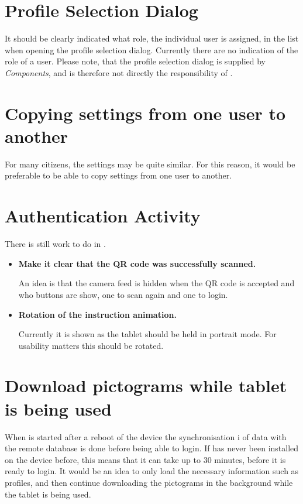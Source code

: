 \section{Profile Selection Dialog}
It should be clearly indicated what role, the individual user is assigned, in the list when opening the profile selection dialog.
Currently there are no indication of the role of a user.
Please note, that the profile selection dialog is supplied by \textit{\giraf Components}, and is therefore not directly the responsibility of \launcher.

\section{Copying settings from one user to another}
For many citizens, the settings may be quite similar.
For this reason, it would be preferable to be able to copy settings from one user to another.

\section{Authentication Activity}
There is still work to do in \authenticationactivity.

\begin{itemize}
	\item \textbf{Make it clear that the QR code was successfully scanned.}

	An idea is that the camera feed is hidden when the QR code is accepted and who buttons are show, one to scan again and one to login.
	\item \textbf{Rotation of the instruction animation.}

	Currently it is shown as the tablet should be held in portrait mode. 
	For usability matters this should be rotated. 
\end{itemize}

\section{Download pictograms while tablet is being used}
When \launcher is started after a reboot of the device the synchronisation i of data with the remote database is done before being able to login.
If \launcher has never been installed on the device before, this means that it can take up to 30 minutes, before it is ready to login.
It would be an idea to only load the necessary information such as profiles, and then continue downloading the pictograms in the background while the tablet is being used.

